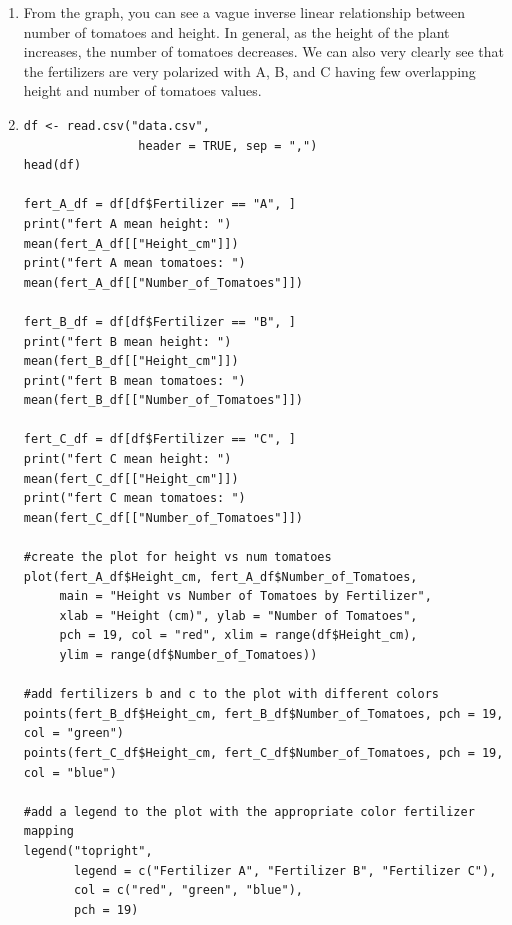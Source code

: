 \documentclass{article}
\begin{document}
\begin{enumerate}
\begin{figure}[ht]
  \label{fig:height_vs_tomatoes}
\end{figure}
\newpage
\item From the graph, you can see a vague inverse linear relationship between number of tomatoes and height. In general, as the height of the plant increases, the number of tomatoes decreases. We can also very clearly see that the fertilizers are very polarized with A, B, and C having few overlapping height and number of tomatoes values. \\
\item 
\begin{verbatim}
df <- read.csv("data.csv",
                header = TRUE, sep = ",")
head(df)

fert_A_df = df[df$Fertilizer == "A", ] 
print("fert A mean height: ")
mean(fert_A_df[["Height_cm"]])
print("fert A mean tomatoes: ")
mean(fert_A_df[["Number_of_Tomatoes"]])

fert_B_df = df[df$Fertilizer == "B", ] 
print("fert B mean height: ")
mean(fert_B_df[["Height_cm"]])
print("fert B mean tomatoes: ")
mean(fert_B_df[["Number_of_Tomatoes"]])

fert_C_df = df[df$Fertilizer == "C", ] 
print("fert C mean height: ")
mean(fert_C_df[["Height_cm"]])
print("fert C mean tomatoes: ")
mean(fert_C_df[["Number_of_Tomatoes"]])

#create the plot for height vs num tomatoes
plot(fert_A_df$Height_cm, fert_A_df$Number_of_Tomatoes,
     main = "Height vs Number of Tomatoes by Fertilizer",
     xlab = "Height (cm)", ylab = "Number of Tomatoes",
     pch = 19, col = "red", xlim = range(df$Height_cm),
     ylim = range(df$Number_of_Tomatoes))

#add fertilizers b and c to the plot with different colors
points(fert_B_df$Height_cm, fert_B_df$Number_of_Tomatoes, pch = 19, col = "green")
points(fert_C_df$Height_cm, fert_C_df$Number_of_Tomatoes, pch = 19, col = "blue")

#add a legend to the plot with the appropriate color fertilizer mapping
legend("topright",
       legend = c("Fertilizer A", "Fertilizer B", "Fertilizer C"),
       col = c("red", "green", "blue"),
       pch = 19)
\end{verbatim}

\end{enumerate}
\end{document}
